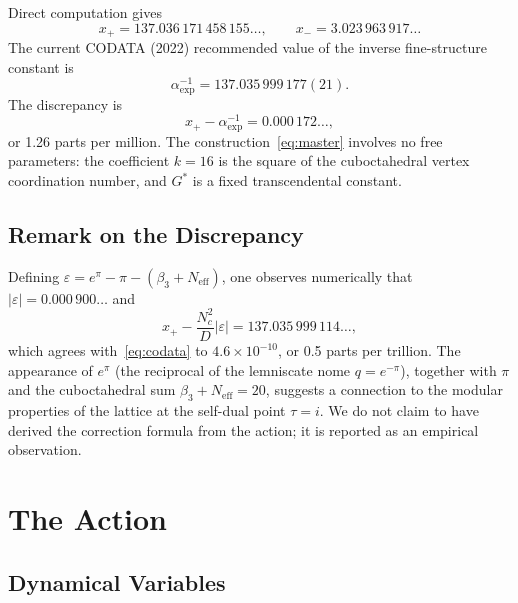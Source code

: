 \documentclass[12pt,a4paper]{article}
\begin{document}
Direct computation gives
\begin{equation}\label{eq:xvalues}
x_{+} = 137.036\,171\,458\,155\ldots, \qquad x_{-} = 3.023\,963\,917\ldots
\end{equation}
The current CODATA (2022) recommended value of the inverse fine-structure constant is~\cite{CODATA}
\begin{equation}\label{eq:codata}
\alpha^{-1}_{\mathrm{exp}} = 137.035\,999\,177(21).
\end{equation}
The discrepancy is
\begin{equation}\label{eq:gap}
x_{+} - \alpha^{-1}_{\mathrm{exp}} = 0.000\,172\ldots,
\end{equation}
or 1.26 parts per million. The construction~\eqref{eq:master} involves no free parameters: the coefficient $k = 16$ is the square of the cuboctahedral vertex coordination number, and $G^{*}$ is a fixed transcendental constant.

\subsection{Remark on the Discrepancy}

Defining $\varepsilon = e^{\pi} - \pi - (\beta_{3} + N_{\mathrm{eff}})$, one observes numerically that $|\varepsilon| = 0.000\,900\ldots$ and
\begin{equation}\label{eq:precision}
x_{+} - \frac{N_{c}^{2}}{D}|\varepsilon| = 137.035\,999\,114\ldots,
\end{equation}
which agrees with~\eqref{eq:codata} to $4.6 \times 10^{-10}$, or 0.5 parts per trillion. The appearance of $e^{\pi}$ (the reciprocal of the lemniscate nome $q = e^{-\pi}$), together with $\pi$ and the cuboctahedral sum $\beta_{3} + N_{\mathrm{eff}} = 20$, suggests a connection to the modular properties of the lattice at the self-dual point $\tau = i$. We do not claim to have derived the correction formula from the action; it is reported as an empirical observation.

\section{The Action}

\subsection{Dynamical Variables}
\end{document}
